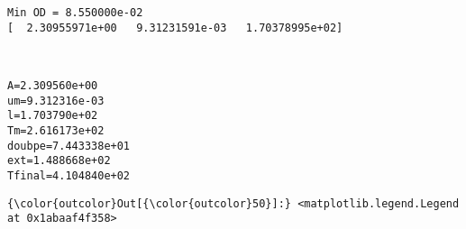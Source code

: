 \documentclass[11pt]{article}
\begin{document}
    \begin{Verbatim}[commandchars=\\\{\}]
Min OD = 8.550000e-02
[  2.30955971e+00   9.31231591e-03   1.70378995e+02]

    \end{Verbatim}

    \begin{center}
    \end{center}
    { \hspace*{\fill} \\}
    
    \begin{Verbatim}[commandchars=\\\{\}]
A=2.309560e+00
um=9.312316e-03
l=1.703790e+02
Tm=2.616173e+02
doubpe=7.443338e+01
ext=1.488668e+02
Tfinal=4.104840e+02

    \end{Verbatim}

            \begin{Verbatim}[commandchars=\\\{\}]
{\color{outcolor}Out[{\color{outcolor}50}]:} <matplotlib.legend.Legend at 0x1abaaf4f358>
\end{Verbatim}
        
    \begin{center}
    \end{center}
    { \hspace*{\fill} \\}
    
    \begin{center}
    \end{center}
    { \hspace*{\fill} \\}
    
\end{document}

